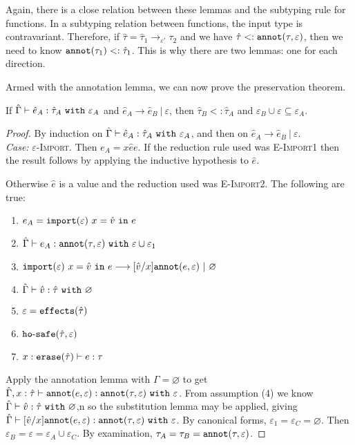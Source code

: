 \noindent
Again, there is a close relation between these lemmas and the subtyping rule for functions. In a subtyping relation between functions, the input type is contravariant. Therefore, if $\hat \tau = \hat \tau_1 \rightarrow_{\varepsilon'} \tau_2$ and we have $\hat \tau <: \mathtt{annot}(\tau, \varepsilon)$, then we need to know $\mathtt{annot}(\tau_1) <: \hat \tau_1$. This is why there are two lemmas: one for each direction.

Armed with the annotation lemma, we can now prove the preservation theorem.

\begin{theorem}
If $\hat \Gamma \vdash \hat e_A: \hat \tau_A~\mathtt{with}~ \varepsilon_A$ and $\hat e_A \longrightarrow \hat e_B~|~\varepsilon$, then $\hat \tau_B <: \hat \tau_A$ and $\varepsilon_B \cup \varepsilon \subseteq \varepsilon_A$.
\end{theorem}

\begin{proof} By induction on $\hat \Gamma \vdash \hat e_A: \hat \tau_A~\mathtt{with}~ \varepsilon_A$, and then on $\hat e_A \longrightarrow \hat e_B~|~\varepsilon$. \\

\textit{Case:} \textsc{$\varepsilon$-Import}. Then $e_A = {x}{\hat e}{e}$. If the reduction rule used was \textsc{E-Import1} then the result follows by applying the inductive hypothesis to $\hat e$.

Otherwise $\hat e$ is a value and the reduction used was \textsc{E-Import2}. The following are true:
\begin{enumerate}
	\setlength\itemsep{-0.7em}
	\item $e_A = \mathtt{import}(\varepsilon)~x = \hat v~\mathtt{in}~ e$
	\item $\hat \Gamma \vdash e_A: \mathtt{annot}(\tau, \varepsilon)~\mathtt{with}~ \varepsilon \cup \varepsilon_1$
	\item $\mathtt{import}(\varepsilon)~x = \hat v~\mathtt{in}~ e \longrightarrow [\hat v/x]\mathtt{annot}(e, \varepsilon)~|~\varnothing$
	\item $\hat \Gamma \vdash \hat v: \hat \tau~\mathtt{with}~ \varnothing$
	\item $\varepsilon = \mathtt{effects}(\hat \tau)$
	\item $\mathtt{ho \hbox{-} safe}(\hat \tau, \varepsilon)$
	\item $x: \mathtt{erase}(\hat \tau) \vdash e: \tau$
\end{enumerate}

\noindent
Apply the annotation lemma with $\Gamma = \varnothing$ to get $\hat \Gamma, x: \hat \tau \vdash \mathtt{annot}(e, \varepsilon): \mathtt{annot}(\tau, \varepsilon)~\mathtt{with}~ \varepsilon$. From assumption (4) we know $\hat \Gamma \vdash \hat v: \hat \tau~\mathtt{with}~ \varnothing$,n so the substitution lemma may be applied, giving $\hat \Gamma \vdash [\hat v/x]\mathtt{annot}(e, \varepsilon): \mathtt{annot}(\tau, \varepsilon)~\mathtt{with}~ \varepsilon$. By canonical forms, $\varepsilon_1 = \varepsilon_C = \varnothing$. Then $\varepsilon_B = \varepsilon = \varepsilon_A \cup \varepsilon_C$. By examination, $\tau_A = \tau_B = \mathtt{annot}(\tau, \varepsilon)$.
\end{proof}

